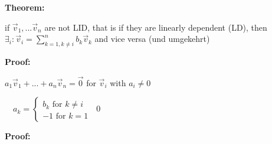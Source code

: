 \begin{doublespace}
{\textbf{Theorem:} 

if $\vec{v}_1,...\vec{v}_n$ are not LID, that is if they are linearly dependent (LD), then $\exists_i:\vec{v}_i=\sum\limits_{k=1,k\neq i}^n b_k\vec{v}_k$ and vice versa (und umgekehrt)}

\textbf{Proof:}

$a_1\vec{v}_1+...+a_n\vec{v}_n=\vec{0}$ for $\vec{v}_i$ with $a_i\neq 0$

$\quad a_k=\left\lbrace \begin{array}{l}b_k \textrm{ for } k\neq i\\-1 \textrm{ for } k=1\end{array}\right.$ \qed


\end{doublespace}
\textbf{Proof:}

